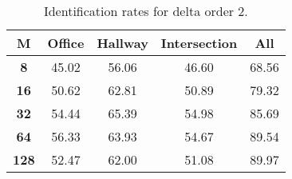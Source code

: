 \begin{table}[h]
    \small
    \centering
    \begin{tabular}{|c|c|c|c|l|}    
    \hline
    {\bf M} & {\bf Office} & {\bf Hallway} & {\bf Intersection} &     \multicolumn{1}{c|}{{\bf All}} \\ \hline
    {\bf 8} & 45.02 & 56.06 & 46.60 & 68.56 \\ \hline
    {\bf 16} & 50.62 & 62.81 & 50.89 & 79.32 \\ \hline
    {\bf 32} & 54.44 & 65.39 & 54.98 & 85.69 \\ \hline
    {\bf 64} & 56.33 & 63.93 & 54.67 & 89.54 \\ \hline
    {\bf 128} & 52.47 & 62.00 & 51.08 & 89.97 \\ \hline
    \end{tabular}
    \caption{Identification rates for delta order 2.}    
    \label{tab:identify_speakers_mit_19_2}
\end{table}
